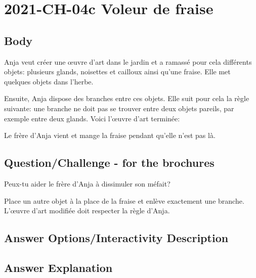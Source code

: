 \documentclass[a4paper,11pt]{report}
\newcommand{\taskGraphicsFolder}{..}
\begin{document}
\section*{\centering{} 2021-CH-04c Voleur de fraise}


\subsection*{Body}

Anja veut créer une œuvre d’art dans le jardin et a ramassé pour cela différents objets: plusieurs glands, noisettes et cailloux ainsi qu’une fraise. Elle met quelques objets dans l’herbe.

Ensuite, Anja dispose des branches entre ces objets. Elle suit pour cela la règle suivante: une branche ne doit pas se trouver entre deux objets pareils, par exemple entre deux glands. Voici l’œuvre d’art terminée:

{\centering%
\par}

Le frère d’Anja vient et mange la fraise pendant qu’elle n’est pas là.

{\em


\subsection*{Question/Challenge - for the brochures}

Peux-tu aider le frère d’Anja à dissimuler son méfait?

Place un autre objet à la place de la fraise et enlève exactement une branche. L’œuvre d’art modifiée doit respecter la règle d’Anja.



{\centering%
\par}

}

\begingroup
\renewcommand{\arraystretch}{1.5}
\subsection*{Answer Options/Interactivity Description}



\endgroup

\subsection*{Answer Explanation}
\end{document}
